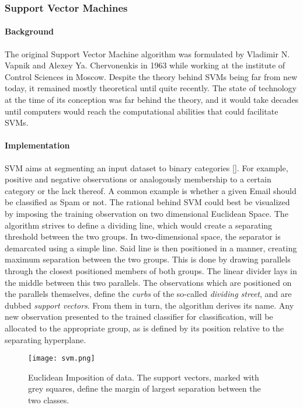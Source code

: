 \subsubsection{Support Vector Machines}
	
	\paragraph{Background}
	The original Support Vector Machine algorithm was formulated by Vladimir N. Vapnik and Alexey Ya. Chervonenkis in 1963 while working at the institute of Control Sciences in Moscow. Despite the theory behind SVMs being far from new today, it remained mostly theoretical until quite recently. The state of technology at the time of its conception was far behind the theory, and it would take decades until computers would reach the computational abilities that could facilitate SVMs.
	
	\paragraph{Implementation}
	SVM aims at segmenting an input dataset to binary categories [\cite{SVM_burges1998tutorial}]. For example, positive and negative observations or analogously membership to a certain category or the lack thereof. A common example is whether a given Email should be classified as Spam or not. The rational behind SVM could best be visualized by imposing the training observation on two dimensional Euclidean Space. The algorithm strives to define a dividing line, which would create a separating threshold between the two groups. In two-dimensional space, the separator is demarcated using a simple line. Said line is then positioned in a manner, creating maximum separation between the two groups. This is done by drawing parallels through the closest positioned members of both groups. The linear divider lays in the middle between this two parallels. The observations which are positioned on the parallels themselves, define the \textit{curbs} of the so-called \textit{dividing street}, and are dubbed \textit{support vectors}. From them in turn, the algorithm derives its name. Any new observation presented to the trained classifier for classification, will be allocated to the appropriate group, as is defined by its position relative to the separating hyperplane. 
	
	\begin{figure}[h]
		\centering
		\captionsetup{width=0.8\textwidth}
		\texttt{[image: svm.png]}
		\caption[SVM in Euclidean Space]{
			\footnotesize{
				Euclidean Imposition of data. The support vectors, marked with grey squares, define the margin of largest separation between the two classes.
			}
		} \cite{SVM_cortes1995support}
	\end{figure}

